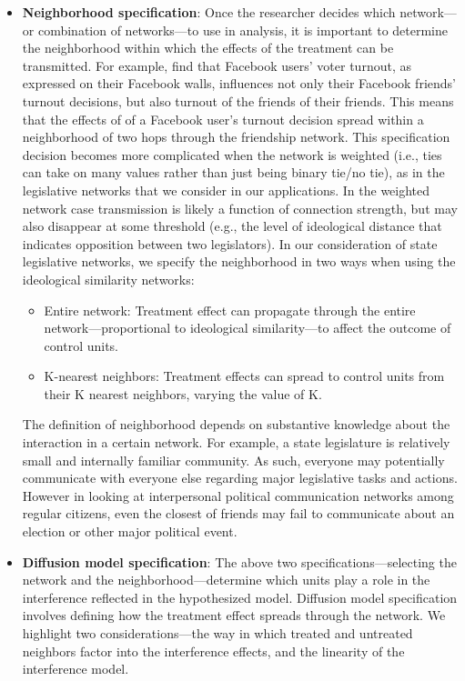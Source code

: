 \documentclass[12pt]{article}
\begin{document}
\begin{itemize}
\item \textbf{Neighborhood specification}:
Once the researcher decides which network---or combination of networks---to use in analysis, it is important to determine the neighborhood within which the effects of the treatment can be transmitted. For example, \cite{Bond:2012} find that Facebook users' voter turnout, as expressed on their Facebook walls, influences not only their Facebook friends' turnout decisions, but also turnout of the friends of their friends. This means that the effects of of a Facebook user's turnout decision spread within a neighborhood of two hops through the friendship network. This specification decision becomes more complicated when the network is weighted (i.e., ties can take on many values rather than just being binary tie/no tie), as in the legislative networks that we consider in our applications. In the weighted network case transmission is likely a function of connection strength, but may also disappear at some threshold (e.g., the level of ideological distance that indicates opposition between two legislators).  In our consideration of state legislative networks, we specify the neighborhood in two ways when using the ideological similarity networks:
\begin{itemize}
\item Entire network: Treatment effect can propagate through the entire network---proportional to ideological similarity---to affect the outcome of control units. 
\item K-nearest neighbors: Treatment effects can spread to control units from their K nearest neighbors, varying the value of K.
\end{itemize}

The definition of neighborhood depends on substantive knowledge about the interaction in a certain network. For example, a state legislature is relatively small and internally familiar community. As such, everyone may potentially communicate with everyone else regarding major legislative tasks and actions. However in looking at interpersonal political communication networks among regular citizens, even the closest of friends may fail to communicate about an election or other major political event.


\item \textbf{Diffusion model specification}:
The above two specifications---selecting the network and the neighborhood---determine which units play a role in the interference reflected in the hypothesized model. Diffusion model specification involves defining how the treatment effect spreads through the network. We highlight two considerations---the way in which treated and untreated neighbors factor into the interference effects, and the linearity of the interference model. 


\end{itemize}
\end{document}
